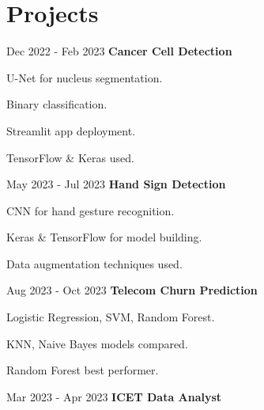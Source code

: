 \section{Projects}
\begin{twocolentry}{Dec 2022 - Feb 2023}
\textbf{Cancer Cell Detection}
\end{twocolentry}
\vspace{0.10 cm}
\begin{onecolentry}
\begin{highlights}
\item U-Net for nucleus segmentation.
\item Binary classification.
\item Streamlit app deployment.
\item TensorFlow & Keras used.
\end{highlights}
\end{onecolentry}
\vspace{0.2 cm}
\begin{twocolentry}{May 2023 - Jul 2023}
\textbf{Hand Sign Detection}
\end{twocolentry}
\vspace{0.10 cm}
\begin{onecolentry}
\begin{highlights}
\item CNN for hand gesture recognition.
\item Keras & TensorFlow for model building.
\item Data augmentation techniques used.
\end{highlights}
\end{onecolentry}
\vspace{0.2 cm}
\begin{twocolentry}{Aug 2023 - Oct 2023}
\textbf{Telecom Churn Prediction}
\end{twocolentry}
\vspace{0.10 cm}
\begin{onecolentry}
\begin{highlights}
\item Logistic Regression, SVM, Random Forest.
\item KNN, Naive Bayes models compared.
\item Random Forest best performer.
\end{highlights}
\end{onecolentry}
\vspace{0.2 cm}
\begin{twocolentry}{Mar 2023 - Apr 2023}
\textbf{ICET Data Analyst}
\end{twocolentry}
